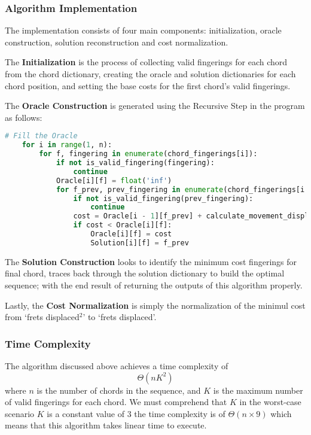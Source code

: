 \documentclass[conference]{IEEEtran}
\begin{document}
\subsubsection{Algorithm Implementation}
The implementation consists of four main components: initialization, oracle construction, solution reconstruction and cost normalization.

The \textbf{Initialization} is the process of collecting valid fingerings for each chord from the chord dictionary, creating the oracle and solution dictionaries for each chord position, and setting the base costs for the first chord's valid fingerings.

The \textbf{Oracle Construction} is generated using the Recursive Step in the program as follows:
\begin{lstlisting}[language=Python]
    # Fill the Oracle
    for i in range(1, n):
        for f, fingering in enumerate(chord_fingerings[i]):
            if not is_valid_fingering(fingering):
                continue
            Oracle[i][f] = float('inf')
            for f_prev, prev_fingering in enumerate(chord_fingerings[i - 1]):
                if not is_valid_fingering(prev_fingering):
                    continue
                cost = Oracle[i - 1][f_prev] + calculate_movement_displacement(prev_fingering, fingering)
                if cost < Oracle[i][f]:
                    Oracle[i][f] = cost
                    Solution[i][f] = f_prev
\end{lstlisting}

The \textbf{Solution Construction} looks to identify the minimum cost fingerings for final chord, traces back through the solution dictionary to build the optimal sequence; with the end result of returning the outputs of this algorithm properly. 

Lastly, the \textbf{Cost Normalization} is simply the normalization of the minimul cost from `frets displaced$^{2}$' to `frets displaced'.

\subsubsection{Time Complexity}
The algorithm discussed above achieves a time complexity of \[ \Theta(nK^2) \] 
where $n$ is the number of chords in the sequence, and $K$ is the maximum number of valid fingerings for each chord. We must comprehend that $K$ in the worst-case scenario $K$ is a constant value of $3$ the time complexity is of \(\Theta(n \times 9) \) which means that this algorithm takes linear time to execute.
\end{document}
